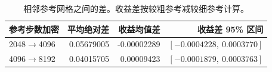 \begin{table}[htbp]\centering\small
\caption{相邻参考网格之间的差。收益差按较粗参考减较细参考计算。}\label{tab:results-reference}
\begin{tabular}{lrrr}\toprule
参考步数加密 & 平均绝对差 & 收益均值差 & 收益差 95\% 区间\\\midrule
2048$\to$4096 & 0.05679005 & -0.00002289 & $[-0.0004228,\ 0.0003770]$\\
4096$\to$8192 & 0.04015705 & 0.00009423 & $[-0.0001879,\ 0.0003763]$\\
\bottomrule
\end{tabular}
\end{table}
